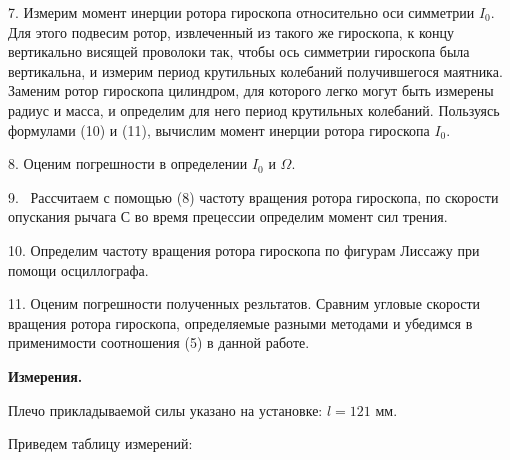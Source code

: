 \documentclass[14pt]{article}
\begin{document}
7. Измерим момент инерции ротора гироскопа относительно оси симметрии $I_0$. Для этого подвесим ротор, извлеченный из такого же гироскопа, к концу вертикально висящей проволоки так, чтобы ось симметрии гироскопа была вертикальна, и измерим период крутильных колебаний получившегося маятника. Заменим ротор гироскопа цилиндром, для которого легко могут быть измерены радиус и масса, и определим для него период крутильных колебаний. Пользуясь формулами (10) и (11), вычислим момент инерции ротора гироскопа $I_0$.

8. Оценим погрешности в определении $I_0$ и $\Omega$.

9. ~Рассчитаем с помощью (8) частоту вращения ротора гироскопа, по скорости опускания рычага С во время прецессии определим момент сил трения.

10. Определим частоту вращения ротора гироскопа по фигурам Лиссажу при помощи осциллографа.

11. Оценим погрешности полученных резльтатов. Сравним угловые скорости вращения ротора гироскопа, определяемые разными методами и убедимся в применимости соотношения (5) в данной работе.

\vspace{1cm}
\textbf{Измерения.}
\vspace{1cm}


Плечо прикладываемой силы указано на установке: $l = 121$ мм.

Приведем таблицу измерений:
\end{document}
